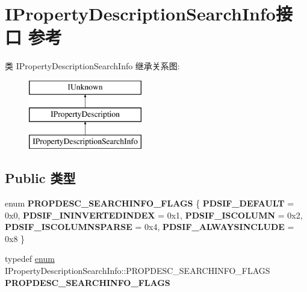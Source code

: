\hypertarget{interface_i_property_description_search_info}{}\section{I\+Property\+Description\+Search\+Info接口 参考}
\label{interface_i_property_description_search_info}
类 I\+Property\+Description\+Search\+Info 继承关系图\+:\begin{figure}[H]
\begin{center}
\leavevmode
\includegraphics[height=3.000000cm]{interface_i_property_description_search_info}
\end{center}
\end{figure}
\subsection*{Public 类型}
\begin{DoxyCompactItemize}
\item 
\mbox{\label{interface_i_property_description_search_info_a1785b6154eacb564e0b5ea5907dee638}} 
enum {\bfseries P\+R\+O\+P\+D\+E\+S\+C\+\_\+\+S\+E\+A\+R\+C\+H\+I\+N\+F\+O\+\_\+\+F\+L\+A\+GS} \{ \newline
{\bfseries P\+D\+S\+I\+F\+\_\+\+D\+E\+F\+A\+U\+LT} = 0x0, 
{\bfseries P\+D\+S\+I\+F\+\_\+\+I\+N\+I\+N\+V\+E\+R\+T\+E\+D\+I\+N\+D\+EX} = 0x1, 
{\bfseries P\+D\+S\+I\+F\+\_\+\+I\+S\+C\+O\+L\+U\+MN} = 0x2, 
{\bfseries P\+D\+S\+I\+F\+\_\+\+I\+S\+C\+O\+L\+U\+M\+N\+S\+P\+A\+R\+SE} = 0x4, 
\newline
{\bfseries P\+D\+S\+I\+F\+\_\+\+A\+L\+W\+A\+Y\+S\+I\+N\+C\+L\+U\+DE} = 0x8
 \}
\item 
\mbox{\label{interface_i_property_description_search_info_a8619fb1d3cf961ea1ac0f37a00e8244d}} 
typedef \hyperlink{interfaceenum}{enum} I\+Property\+Description\+Search\+Info\+::\+P\+R\+O\+P\+D\+E\+S\+C\+\_\+\+S\+E\+A\+R\+C\+H\+I\+N\+F\+O\+\_\+\+F\+L\+A\+GS {\bfseries P\+R\+O\+P\+D\+E\+S\+C\+\_\+\+S\+E\+A\+R\+C\+H\+I\+N\+F\+O\+\_\+\+F\+L\+A\+GS}
\end{DoxyCompactItemize}
